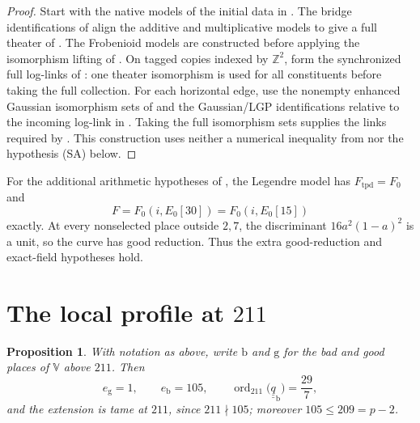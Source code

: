 \documentclass[11pt]{article}
\theoremstyle{plain}
\newtheorem{proposition}[theorem]{Proposition}
\theoremstyle{definition}
\newcommand{\VV}{\mathbb{V}}
\newcommand{\SA}{\textup{(SA)}}
\newcommand{\ord}{\operatorname{ord}}
\begin{document}
\begin{proof}
Start with the native models of the initial data in
\cite[Examples 3.2--3.5, 4.3, 4.4, 5.4, 6.2, 6.3]{IUT1}.
The bridge identifications of
\cite[Proposition 4.8(ii), Proposition 6.7]{IUT1} align the additive and
multiplicative models to give a full theater of
\cite[Definition 6.13]{IUT1}.
The Frobenioid models are constructed before applying the isomorphism
lifting of \cite[Corollary 5.3(ii)]{IUT1}.
On tagged copies indexed by $\mathbb Z^2$, form the synchronized full
log-links of \cite[Proposition 1.3]{IUT3}: one theater isomorphism is used
for all constituents before taking the full collection.
For each horizontal edge, use the nonempty enhanced Gaussian isomorphism
sets of \cite[Corollary 4.10(iii)]{IUT2} and the Gaussian/LGP identifications
relative to the incoming log-link in \cite[Proposition 3.7]{IUT3}.
Taking the full isomorphism sets supplies the links required by
\cite[Definition 3.8(ii),(iii)]{IUT3}.
This construction uses neither a numerical inequality from
\cite[Corollary 3.12]{IUT3} nor the hypothesis \SA{} below.
\end{proof}

For the additional arithmetic hypotheses of \cite[Theorem 1.10]{IUT4},
the Legendre model has $F_{\mathrm{tpd}}=F_0$ and
\[
 F=F_0(i,E_0[30])=F_0(i,E_0[15])
\]
exactly. At every nonselected place outside $2,7$, the discriminant
$16a^2(1-a)^2$ is a unit, so the curve has good reduction.
Thus the extra good-reduction and exact-field hypotheses hold.

\section{The local profile at \texorpdfstring{$211$}{211}}\label{sec:profile}

\begin{proposition}\label{prop:profile}
With notation as above, write $\mathrm{b}$ and $\mathrm{g}$ for the bad and good
places of $\VV$ above $211$.  Then
\[
  e_{\mathrm{g}}=1,\qquad e_{\mathrm{b}}=105,\qquad
  \ord_{211}\bigl(\underline{\underline q}_{\mathrm{b}}\bigr)=\frac{29}{7},
\]
and the extension is tame at $211$, since $211\nmid105$; moreover
$105\le209=p-2$.
\end{proposition}
\end{document}
